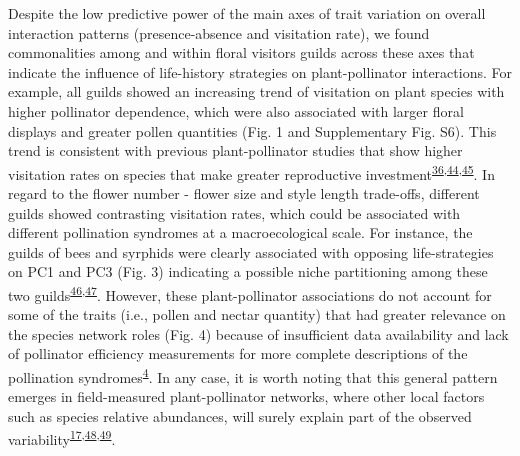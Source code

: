 \documentclass[12pt,a4paper,]{article}
\begin{document}
Despite the low predictive power of the main axes of trait variation on
overall interaction patterns (presence-absence and visitation rate), we
found commonalities among and within floral visitors guilds across these
axes that indicate the influence of life-history strategies on
plant-pollinator interactions. For example, all guilds showed an
increasing trend of visitation on plant species with higher pollinator
dependence, which were also associated with larger floral displays and
greater pollen quantities (Fig. 1 and Supplementary Fig. S6). This trend
is consistent with previous plant-pollinator studies that show higher
visitation rates on species that make greater reproductive
investment\textsuperscript{\protect\hyperlink{ref-lazaro2013}{36},\protect\hyperlink{ref-hegland2005}{44},\protect\hyperlink{ref-kaiser2014}{45}}.
In regard to the flower number - flower size and style length
trade-offs, different guilds showed contrasting visitation rates, which
could be associated with different pollination syndromes at a
macroecological scale. For instance, the guilds of bees and syrphids
were clearly associated with opposing life-strategies on PC1 and PC3
(Fig. 3) indicating a possible niche partitioning among these two
guilds\textsuperscript{\protect\hyperlink{ref-palmer2003}{46},\protect\hyperlink{ref-phillips2020}{47}}.
However, these plant-pollinator associations do not account for some of
the traits (i.e., pollen and nectar quantity) that had greater relevance
on the species network roles (Fig. 4) because of insufficient data
availability and lack of pollinator efficiency measurements for more
complete descriptions of the pollination
syndromes\textsuperscript{\protect\hyperlink{ref-dellinger2020}{4}}. In
any case, it is worth noting that this general pattern emerges in
field-measured plant-pollinator networks, where other local factors such
as species relative abundances, will surely explain part of the observed
variability\textsuperscript{\protect\hyperlink{ref-bartomeus2016}{17},\protect\hyperlink{ref-vazquez2007}{48},\protect\hyperlink{ref-encinas2012}{49}}.
\end{document}
